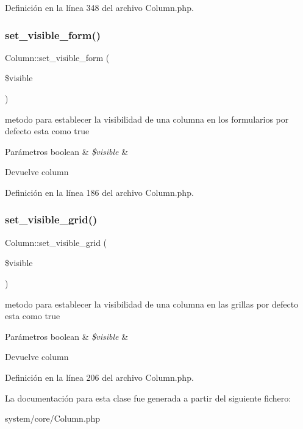 Definición en la línea 348 del archivo Column.\+php.

\mbox{\label{class_column_a66009bdbc227c7cc6764f31152270e08}} 
\subsubsection{\texorpdfstring{set\_visible\_form()}{set\_visible\_form()}}
{\footnotesize\ttfamily Column\+::set\+\_\+visible\+\_\+form (\begin{DoxyParamCaption}\item[{}]{\$visible }\end{DoxyParamCaption})}

metodo para establecer la visibilidad de una columna en los formularios por defecto esta como true


\begin{DoxyParams}[1]{Parámetros}
boolean & {\em \$visible} & \\
\hline
\end{DoxyParams}
\begin{DoxyReturn}{Devuelve}
column 
\end{DoxyReturn}


Definición en la línea 186 del archivo Column.\+php.

\mbox{\label{class_column_a81a3179f6cfb539a346089975a482da5}} 
\subsubsection{\texorpdfstring{set\_visible\_grid()}{set\_visible\_grid()}}
{\footnotesize\ttfamily Column\+::set\+\_\+visible\+\_\+grid (\begin{DoxyParamCaption}\item[{}]{\$visible }\end{DoxyParamCaption})}

metodo para establecer la visibilidad de una columna en las grillas por defecto esta como true


\begin{DoxyParams}[1]{Parámetros}
boolean & {\em \$visible} & \\
\hline
\end{DoxyParams}
\begin{DoxyReturn}{Devuelve}
column 
\end{DoxyReturn}


Definición en la línea 206 del archivo Column.\+php.



La documentación para esta clase fue generada a partir del siguiente fichero\+:\begin{DoxyCompactItemize}
\item 
system/core/Column.\+php\end{DoxyCompactItemize}
